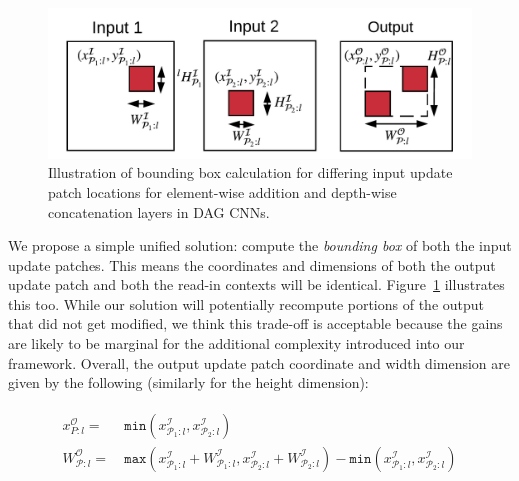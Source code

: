 \begin{figure}[t]
\includegraphics[width=\columnwidth]{images/la_operators}
\vspace{-8mm}
\caption{Illustration of bounding box calculation for differing input update patch locations for element-wise addition and depth-wise concatenation layers in DAG CNNs.}
\label{fig:la_operators}
\end{figure}

We propose a simple unified solution: compute the \textit{bounding box} of both the input update patches. This means the coordinates and dimensions of both the output update patch and both the read-in contexts will be identical. Figure~\ref{fig:la_operators} illustrates this too. While our solution will potentially recompute portions of the output that did not get modified, we think this trade-off is acceptable because the gains are likely to be marginal for the additional complexity introduced into our framework. Overall, the output update patch coordinate and width dimension are given by the following (similarly for the height dimension):

\vspace{-4mm}
\begin{align}
\begin{split}
x^\mathcal{O}_{P:l} =&~ \texttt{min}(x^\mathcal{I}_{\mathcal{P}_1:l}, x^\mathcal{I}_{\mathcal{P}_2:l})\\
W^\mathcal{O}_{\mathcal{P}:l} =&~ \texttt{max}(x^\mathcal{I}_{\mathcal{P}_1:l}+W^\mathcal{I}_{\mathcal{P}_1:l},x^\mathcal{I}_{\mathcal{P}_2:l}+W^\mathcal{I}_{\mathcal{P}_2:l}) -\texttt{min}(x^\mathcal{I}_{\mathcal{P}_1:l},x^\mathcal{I}_{\mathcal{P}_2:l})
\end{split}
\end{align}

